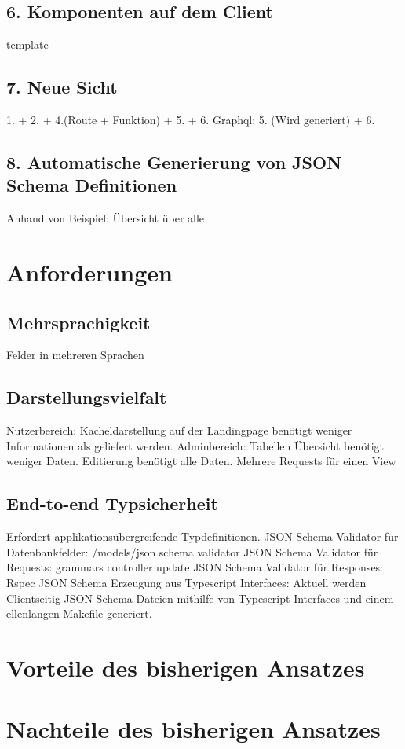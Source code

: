 \subsection{6. Komponenten auf dem Client}
template
\subsection{7. Neue Sicht}
1. + 2. + 4.(Route + Funktion) + 5. + 6.
Graphql: 5. (Wird generiert) + 6.
\subsection{8. Automatische Generierung von JSON Schema Definitionen}
Anhand von Beispiel: Übersicht über alle

\section{Anforderungen}

\subsection{Mehrsprachigkeit}
Felder in mehreren Sprachen

\subsection{Darstellungsvielfalt}
Nutzerbereich:
Kacheldarstellung auf der Landingpage benötigt weniger Informationen als geliefert werden.
Adminbereich:
Tabellen Übersicht benötigt weniger Daten. Editierung benötigt alle Daten.
Mehrere Requests für einen View

\subsection{End-to-end Typsicherheit}
Erfordert applikationsübergreifende Typdefinitionen.
JSON Schema Validator für Datenbankfelder:
/models/json schema validator
JSON Schema Validator für Requests:
grammars controller update
JSON Schema Validator für Responses:
Rspec
JSON Schema Erzeugung aus Typescript Interfaces:
Aktuell werden Clientseitig JSON Schema Dateien mithilfe von Typescript Interfaces und einem ellenlangen Makefile generiert.

\section{Vorteile des bisherigen Ansatzes}
\section{Nachteile des bisherigen Ansatzes}
